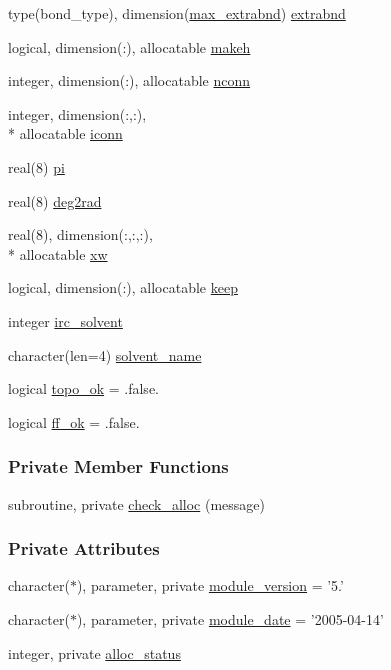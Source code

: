 \begin{DoxyCompactItemize}
\item 
type(bond\-\_\-type), dimension(\hyperlink{classprep_a0954fb2199580b767b0fec5e0d190eb0}{max\-\_\-extrabnd}) \hyperlink{classprep_ad8cf2067e77b186f2d5601ee6da085c1}{extrabnd}
\item 
logical, dimension(\-:), allocatable \hyperlink{classprep_a675b91e8d296db8b3cfcf39516b278a3}{makeh}
\item 
integer, dimension(\-:), allocatable \hyperlink{classprep_a61e6a6610a60fcf8e557aeeb68215ccb}{nconn}
\item 
integer, dimension(\-:,\-:), \\*
allocatable \hyperlink{classprep_a5a02e0194d123205200fc6c1f8267df4}{iconn}
\item 
real(8) \hyperlink{classprep_a1e865a41955c21ed803962409e39acf9}{pi}
\item 
real(8) \hyperlink{classprep_a7b7c9985659296eb39ad6c6be3b156a7}{deg2rad}
\item 
real(8), dimension(\-:,\-:,\-:), \\*
allocatable \hyperlink{classprep_aa9c1e662e10b97582fdefac8e317ab53}{xw}
\item 
logical, dimension(\-:), allocatable \hyperlink{classprep_ade7b1c1c2de355450a64197eefc36d28}{keep}
\item 
integer \hyperlink{classprep_a47b263321dda7fb6c374e3f622fdf735}{irc\-\_\-solvent}
\item 
character(len=4) \hyperlink{classprep_aa665c6e3401ced3ba9d6e361beb2a4b5}{solvent\-\_\-name}
\item 
logical \hyperlink{classprep_a2b85c6800fc53b36e3c2c07b5af26dbb}{topo\-\_\-ok} = .false.
\item 
logical \hyperlink{classprep_ad93c90f3fad2706aabf577cd4a7bc3e5}{ff\-\_\-ok} = .false.
\end{DoxyCompactItemize}
\subsubsection*{Private Member Functions}
\begin{DoxyCompactItemize}
\item 
subroutine, private \hyperlink{classprep_afbb47add947423aeae686c4021702ab1}{check\-\_\-alloc} (message)
\end{DoxyCompactItemize}
\subsubsection*{Private Attributes}
\begin{DoxyCompactItemize}
\item 
character($\ast$), parameter, private \hyperlink{classprep_af285bdd5135ab10225b55c9a2ed4d0d0}{module\-\_\-version} = '5.'
\item 
character($\ast$), parameter, private \hyperlink{classprep_a1e39aac67364bce4d4389f161fe8555e}{module\-\_\-date} = '2005-\/04-\/14'
\item 
integer, private \hyperlink{classprep_a87d974b870f3e4297b7616cd4516d489}{alloc\-\_\-status}
\end{DoxyCompactItemize}



